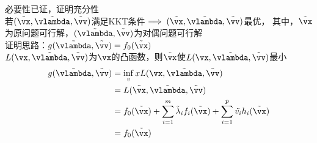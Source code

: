 \begin{analysis}
    必要性已证，证明充分性\\
    若$(\tilde{\vx},\tilde{\vlambda},\tilde{\vv})$满足KKT条件$\implies(\tilde{\vx},\tilde{\vlambda},\tilde{\vv})$最优，
    其中，$\tilde{\vx}$为原问题可行解，$(\tilde{\vlambda},\tilde{\vv})$为对偶问题可行解\\
    证明思路：$g(\tilde{\vlambda},\tilde{\vv})=f_0(\tilde{\vx})$\\
    $L(\vx,\tilde{\vlambda},\tilde{\vv})$为$\vx$的凸函数，则$\tilde{\vx}$使$L(\vx,\tilde{\vlambda},\tilde{\vv})$最小
    \[\begin{aligned}
        g(\tilde{\vlambda},\tilde{\vv})&=\inf_vx L(\vx,\tilde{\vlambda},\tilde{\vv})\\
        &=L(\tilde{\vx},\tilde{\vlambda},\tilde{\vv})\\
        &=f_0(\tilde{\vx})+\sum_{i=1}^m\tilde{\lambda}_if_i(\tilde{\vx})+\sum_{i=1}^p\tilde{v_i}h_i(\tilde{\vx})\\
        &=f_0(\tilde{\vx})
    \end{aligned}\]
\end{analysis}


